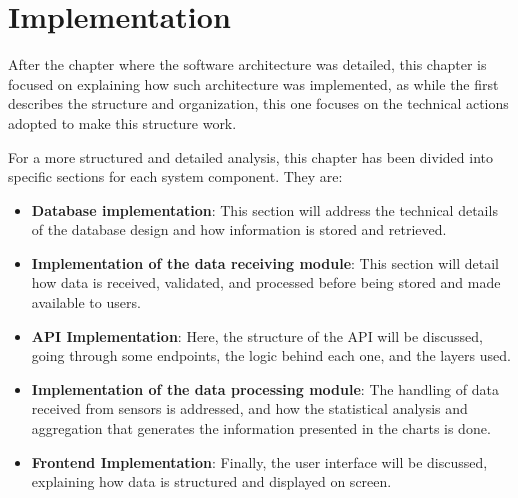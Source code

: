 \chapter{Implementation}\label{cap:implementation}

After the chapter where the software architecture was detailed, this chapter is focused on explaining how such architecture was implemented, as while the first describes the structure and organization, this one focuses on the technical actions adopted to make this structure work.

For a more structured and detailed analysis, this chapter has been divided into specific sections for each system component. They are:

\begin{itemize}
    \item \textbf{Database implementation}: This section will address the technical details of the database design and how information is stored and retrieved.
    
    \item \textbf{Implementation of the data receiving module}: This section will detail how data is received, validated, and processed before being stored and made available to users.
    
    \item \textbf{API Implementation}: Here, the structure of the \gls{API} will be discussed, going through some endpoints, the logic behind each one, and the layers used.
    
    \item \textbf{Implementation of the data processing module}: The handling of data received from sensors is addressed, and how the statistical analysis and aggregation that generates the information presented in the charts is done.
    
    \item \textbf{Frontend Implementation}: Finally, the user interface will be discussed, explaining how data is structured and displayed on screen.
\end{itemize}









